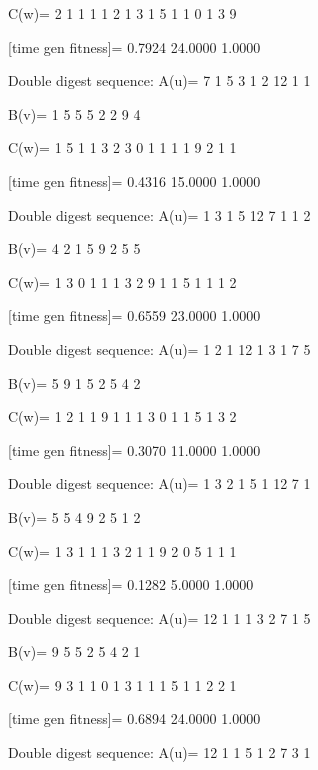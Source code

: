 C(w)=
     2     1     1     1     1     2     1     3     1     5     1     1     0     1     3     9

[time gen fitness]=
    0.7924   24.0000    1.0000

Double digest sequence:
A(u)=
     7     1     5     3     1     2    12     1     1

B(v)=
     1     5     5     5     2     2     9     4

C(w)=
     1     5     1     1     3     2     3     0     1     1     1     1     9     2     1     1

[time gen fitness]=
    0.4316   15.0000    1.0000

Double digest sequence:
A(u)=
     1     3     1     5    12     7     1     1     2

B(v)=
     4     2     1     5     9     2     5     5

C(w)=
     1     3     0     1     1     1     3     2     9     1     1     5     1     1     1     2

[time gen fitness]=
    0.6559   23.0000    1.0000

Double digest sequence:
A(u)=
     1     2     1    12     1     3     1     7     5

B(v)=
     5     9     1     5     2     5     4     2

C(w)=
     1     2     1     1     9     1     1     1     3     0     1     1     5     1     3     2

[time gen fitness]=
    0.3070   11.0000    1.0000

Double digest sequence:
A(u)=
     1     3     2     1     5     1    12     7     1

B(v)=
     5     5     4     9     2     5     1     2

C(w)=
     1     3     1     1     1     3     2     1     1     9     2     0     5     1     1     1

[time gen fitness]=
    0.1282    5.0000    1.0000

Double digest sequence:
A(u)=
    12     1     1     1     3     2     7     1     5

B(v)=
     9     5     5     2     5     4     2     1

C(w)=
     9     3     1     1     0     1     3     1     1     1     5     1     1     2     2     1

[time gen fitness]=
    0.6894   24.0000    1.0000

Double digest sequence:
A(u)=
    12     1     1     5     1     2     7     3     1

